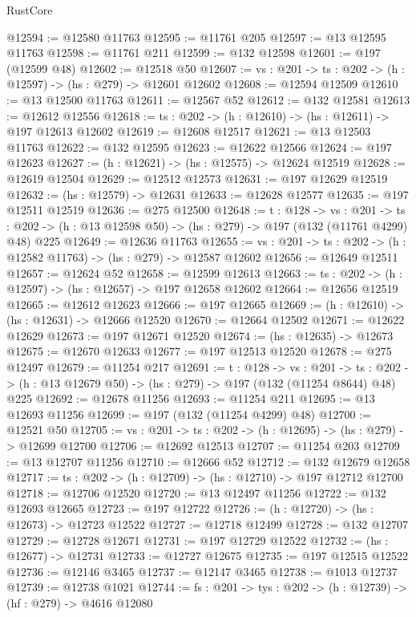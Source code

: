 \begin{lexlean}{RustCore}
\begin{coremodule}
@12594 := @12580 @11763
@12595 := @11761 @205
@12597 := @13 @12595 @11763
@12598 := @11761 @211
@12599 := @132 @12598
@12601 := @197 (@12599 @48)
@12602 := @12518 @50
@12607 := {vs : @201} -> {ts : @202} -> (h : @12597) -> (hs : @279) -> @12601 @12602
@12608 := @12594 @12509
@12610 := @13 @12500 @11763
@12611 := @12567 @52
@12612 := @132 @12581
@12613 := @12612 @12556
@12618 := {ts : @202} -> (h : @12610) -> (hs : @12611) -> @197 @12613 @12602
@12619 := @12608 @12517
@12621 := @13 @12503 @11763
@12622 := @132 @12595
@12623 := @12622 @12566
@12624 := @197 @12623
@12627 := (h : @12621) -> (hs : @12575) -> @12624 @12519
@12628 := @12619 @12504
@12629 := @12512 @12573
@12631 := @197 @12629 @12519
@12632 := (hs : @12579) -> @12631
@12633 := @12628 @12577
@12635 := @197 @12511 @12519
@12636 := @275 @12500
@12648 := {t : @128} ->
  {vs : @201} ->
  {ts : @202} -> (h : @13 @12598 @50) -> (hs : @279) -> @197 (@132 (@11761 @4299) @48) @225
@12649 := @12636 @11763
@12655 := {vs : @201} -> {ts : @202} -> (h : @12582 @11763) -> (hs : @279) -> @12587 @12602
@12656 := @12649 @12511
@12657 := @12624 @52
@12658 := @12599 @12613
@12663 := {ts : @202} -> (h : @12597) -> (hs : @12657) -> @197 @12658 @12602
@12664 := @12656 @12519
@12665 := @12612 @12623
@12666 := @197 @12665
@12669 := (h : @12610) -> (hs : @12631) -> @12666 @12520
@12670 := @12664 @12502
@12671 := @12622 @12629
@12673 := @197 @12671 @12520
@12674 := (hs : @12635) -> @12673
@12675 := @12670 @12633
@12677 := @197 @12513 @12520
@12678 := @275 @12497
@12679 := @11254 @217
@12691 := {t : @128} ->
  {vs : @201} ->
  {ts : @202} -> (h : @13 @12679 @50) -> (hs : @279) -> @197 (@132 (@11254 @8644) @48) @225
@12692 := @12678 @11256
@12693 := @11254 @211
@12695 := @13 @12693 @11256
@12699 := @197 (@132 (@11254 @4299) @48)
@12700 := @12521 @50
@12705 := {vs : @201} -> {ts : @202} -> (h : @12695) -> (hs : @279) -> @12699 @12700
@12706 := @12692 @12513
@12707 := @11254 @203
@12709 := @13 @12707 @11256
@12710 := @12666 @52
@12712 := @132 @12679 @12658
@12717 := {ts : @202} -> (h : @12709) -> (hs : @12710) -> @197 @12712 @12700
@12718 := @12706 @12520
@12720 := @13 @12497 @11256
@12722 := @132 @12693 @12665
@12723 := @197 @12722
@12726 := (h : @12720) -> (hs : @12673) -> @12723 @12522
@12727 := @12718 @12499
@12728 := @132 @12707
@12729 := @12728 @12671
@12731 := @197 @12729 @12522
@12732 := (hs : @12677) -> @12731
@12733 := @12727 @12675
@12735 := @197 @12515 @12522
@12736 := @12146 @3465
@12737 := @12147 @3465
@12738 := @1013 @12737
@12739 := @12738 @1021
@12744 := {fs : @201} -> {tys : @202} -> (h : @12739) -> (hf : @279) -> @4616 @12080

\end{coremodule}
\end{lexlean}
